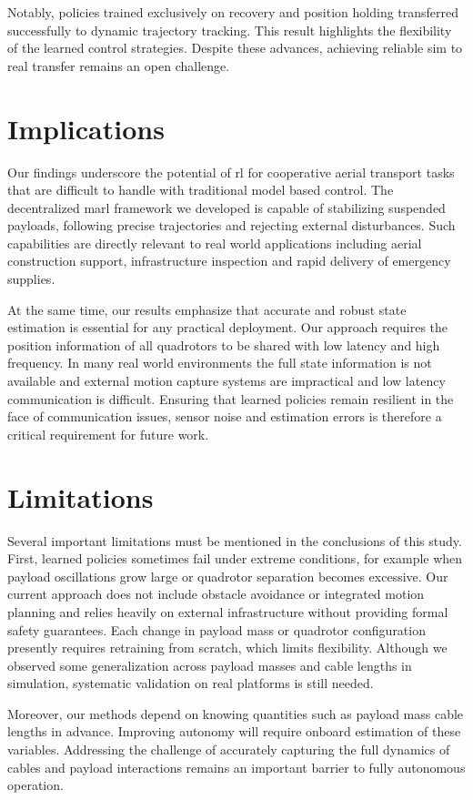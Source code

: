 Notably, policies trained exclusively on recovery and position holding transferred successfully to dynamic trajectory tracking. This result highlights the flexibility of the learned control strategies. Despite these advances, achieving reliable sim to real transfer remains an open challenge.

\section{Implications}
Our findings underscore the potential of \gls{rl} for cooperative aerial transport tasks that are difficult to handle with traditional model based control. The decentralized \gls{marl} framework we developed is capable of stabilizing suspended payloads, following precise trajectories and rejecting external disturbances. Such capabilities are directly relevant to real world applications including aerial construction support, infrastructure inspection and rapid delivery of emergency supplies.

At the same time, our results emphasize that accurate and robust state estimation is essential for any practical deployment. Our approach requires the position information of all quadrotors to be shared with low latency and high frequency. In many real world environments the full state information is not available and external motion capture systems are impractical and low latency communication is difficult. Ensuring that learned policies remain resilient in the face of communication issues, sensor noise and estimation errors is therefore a critical requirement for future work.

\section{Limitations}
Several important limitations must be mentioned in the conclusions of this study. First, learned policies sometimes fail under extreme conditions, for example when payload oscillations grow large or quadrotor separation becomes excessive. Our current approach does not include obstacle avoidance or integrated motion planning and relies heavily on external infrastructure without providing formal safety guarantees. Each change in payload mass or quadrotor configuration presently requires retraining from scratch, which limits flexibility. Although we observed some generalization across payload masses and cable lengths in simulation, systematic validation on real platforms is still needed.

Moreover, our methods depend on knowing quantities such as payload mass cable lengths in advance. Improving autonomy will require onboard estimation of these variables. Addressing the challenge of accurately capturing the full dynamics of cables and payload interactions remains an important barrier to fully autonomous operation.

